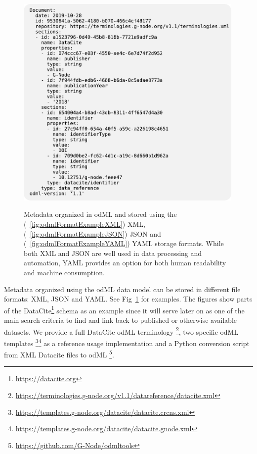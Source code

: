 \documentclass{article}
\begin{document}
\begin{figure}
\begin{minipage}[b]{.3\linewidth}
     \label{fig:odmlFormatExampleJSON}
   \end{minipage}
   \begin{minipage}[b]{.3\linewidth}
     \centering
     \includegraphics[width=0.99\textwidth]{figures/figFormatExampleC.pdf}
     \label{fig:odmlFormatExampleYAML}
   \end{minipage}
   \caption{Metadata organized in odML and stored using the (~\ref{fig:odmlFormatExampleXML}) XML, (~\ref{fig:odmlFormatExampleJSON}) JSON and (~\ref{fig:odmlFormatExampleYAML}) YAML storage formats. While both XML and JSON are well used in data processing and automation, YAML provides an option for both human readability and machine consumption.}
   \label{fig:odmlFormatExample}
\end{figure}

Metadata organized using the odML data model can be stored in different file formats: XML, JSON and YAML. See Fig~\ref{fig:odmlFormatExample} for examples. The figures show parts of the DataCite\footnote{\url{https://datacite.org}}  schema as an example since it will serve later on as one of the main search criteria to find and link back to published or otherwise available datasets. We provide a full DataCite odML terminology
\footnote{\url{https://terminologies.g-node.org/v1.1/datareference/datacite.xml}}, two specific odML templates \footnote{\url{https://templates.g-node.org/datacite/datacite.crcns.xml}}\footnote{\url{https://templates.g-node.org/datacite/datacite.gnode.xml}} as a reference usage implementation and a Python conversion script from XML Datacite files to odML \footnote{\url{https://github.com/G-Node/odmltools}}.
\end{document}
